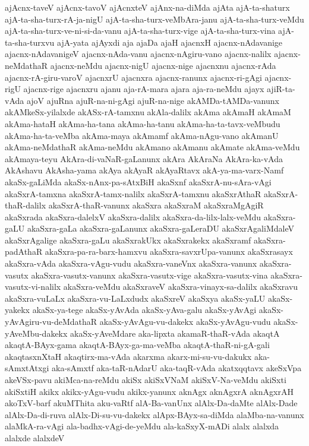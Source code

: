 {ajAcnx-taveV
ajAcnx-tavoV
ajAcnxteV
ajAnx-na-diMda
ajAta
ajA-ta-shaturx
ajA-ta-sha-turx-rA-ja-nigU
ajA-ta-sha-turx-veMbAra-janu
ajA-ta-sha-turx-veMdu
ajA-ta-sha-turx-ve-ni-si-da-vanu
ajA-ta-sha-turx-vige
ajA-ta-sha-turx-vina
ajA-ta-sha-turxvu
ajA-yata
ajAyxdi
aja
ajaDa
ajaH
ajacnxH
ajacnx-nAdavanige
ajacnx-nAdavanigeV
ajacnx-nAda-vanu
ajacnx-nAgiru-vano
ajacnx-nalilx
ajacnx-neMdathaR
ajacnx-neMdu
ajacnx-nigU
ajacnx-nige
ajacnxnu
ajacnx-rAda
ajacnx-rA-giru-varoV
ajacnxrU
ajacnxra
ajacnx-ranunx
ajacnx-ri-gAgi
ajacnx-rigU
ajacnx-rige
ajacnxru
ajanu
aja-rA-mara
ajara
aja-ra-neMdu
ajayx
ajiR-ta-vAda
ajoV
ajuRna
ajuR-na-ni-gAgi
ajuR-na-nige
akAMDa-tAMDa-vanunx
akAMkeSx-yilalxde
akASx-rA-tamxnu
akAla-dalilx
akAma
akAmaH
akAmaM
akAma-hataH
akAma-ha-tana
akAma-ha-tanu
akAma-ha-ta-tavx-veMbudu
akAma-ha-ta-veMba
akAma-maya
akAmamf
akAma-nAgu-vano
akAmanU
akAma-neMdathaR
akAma-neMdu
akAmano
akAmanu
akAmate
akAma-veMdu
akAmaya-teyu
AkAra-di-vaNaR-gaLanunx
akAra
AkAraNa
AkAra-ka-vAda
AkAshavu
AkAsha-yama
akAya
akAyaR
akAyaRtavx
akA-ya-ma-varx-Namf
akaSx-gaLiMda
akaSx-nAnx-pa-sAtxBiH
akaSxnf
akaSxrA-nu-sAra-vAgi
akaSxrA-tamxna
akaSxrA-tamx-nalilx
akaSxrA-tamxnu
akaSxrAthaR
akaSxrA-thaR-dalilx
akaSxrA-thaR-vanunx
akaSxra
akaSxraM
akaSxraMgAgiR
akaSxrada
akaSxra-dalelxV
akaSxra-dalilx
akaSxra-da-lilx-lalx-veMdu
akaSxra-gaLU
akaSxra-gaLa
akaSxra-gaLanunx
akaSxra-gaLeraDU
akaSxrAgaliMdaleV
akaSxrAgalige
akaSxra-gaLu
akaSxrakUkx
akaSxrakekx
akaSxramf
akaSxra-padAthaR
akaSxra-pa-ra-barx-hamxvu
akaSxra-savxrUpa-vanunx
akaSxrasayx
akaSxra-vAda
akaSxra-vAgu-vudu
akaSxra-vaneVnx
akaSxra-vanunx
akaSxra-vasutx
akaSxra-vasutx-vanunx
akaSxra-vasutx-vige
akaSxra-vasutx-vina
akaSxra-vasutx-vi-nalilx
akaSxra-veMdu
akaSxraveV
akaSxra-vinayx-sa-dalilx
akaSxravu
akaSxra-vuLaLx
akaSxra-vu-LaLxdudx
akaSxreV
akaSxya
akaSx-yaLU
akaSx-yakekx
akaSx-ya-tege
akaSx-yAvAda
akaSx-yAva-galu
akaSx-yAvAgi
akaSx-yAvAgiru-vu-deMdathaR
akaSx-yAvAgu-vu-dakekx
akaSx-yAvAgu-vudu
akaSx-yAveMbu-dakekx
akaSx-yAveMdare
aka-lipxta
akamaR-thaR-vAda
akaqtA
akaqtA-BAyx-gama
akaqtA-BAyx-ga-ma-veMba
akaqtA-thaR-ni-gA-gali
akaqtasxnXtaH
akaqtirx-ma-vAda
akarxma
akarx-mi-su-vu-dakukx
aka-sAmxtAtxgi
aka-sAmxtf
aka-taR-nAdarU
aka-taqR-vAda
akatxqqtavx
akeSxVpa
akeVSx-pavu
akiMca-na-reMdu
akiSx
akiSxVNaM
akiSxV-Na-veMdu
akiSxti
akiSxtiH
akikx
akikx-yAgu-vudu
akikx-yanunx
aknAgx
aknAgxrA
aknAgxrAH
akoTxV-barf
akuMThita
aku-vaRtf
alA-Ba-vanUnx
alAlx-Da-daMte
alAlx-Dade
alAlx-Da-di-ruva
alAlx-Di-su-vu-dakekx
alApx-BAyx-sa-diMda
alaMba-na-vanunx
alaMkA-ra-vAgi
ala-badhx-vAgi-de-yeMdu
ala-kaSxyX-mADi
alalx
alalxda
alalxde
alalxdeV
}
